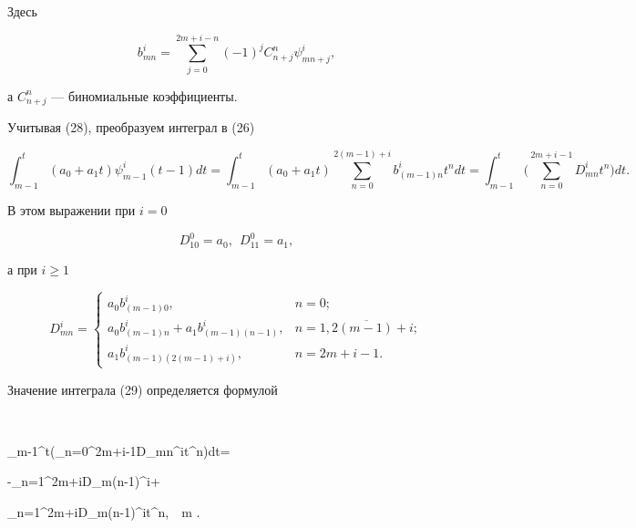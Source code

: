 Здесь


$$


b_{mn}^i=\sum_{j=0}^{2m+i-n}(-1)^jC_{n+j}^n\psi_{mn+j}^i,


$$


а $C_{n+j}^n$ --- биномиальные коэффициенты.





Учитывая (28), преобразуем интеграл в (26)


\begin{equation}


\int_{m-1}^t (a_0+a_1t)\psi_{m-1}^i(t-1)dt =


\int_{m-1}^t (a_0+a_1t)


\sum_{n=0}^{2(m-1)+i}b_{(m-1)n}^it^ndt =


\int_{m-1}^t\bigg(\sum\limits_{n=0}^{2m+i-1}D_{mn}^it^n\bigg)dt.


\end{equation}


В этом выражении при $i=0$


\begin{equation}


D_{10}^0=a_0,\ \ D_{11}^0=a_1,


\end{equation}


а при $i\geq 1$


\begin{equation}


D_{mn}^i=


\begin{cases}


a_0b_{(m-1)0}^i, & n=0;\\


a_0b_{(m-1)n}^i+a_1b_{(m-1)(n-1)}^i, & n=\overline{1,2(m-1)+i};\\


a_1b_{(m-1)(2(m-1)+i)}^i, & n=2m+i-1.


\end{cases}


\end{equation}


Значение интеграла (29) определяется формулой


$$


\int_{m-1}^t\bigg(\sum_{n=0}^{2m+i-1}D_{mn}^it^n\bigg)dt=


-\sum_{n=1}^{2m+i}D_{m(n-1)}^i+


\sum_{n=1}^{2m+i}D_{m(n-1)}^it^n,\ \ m .


